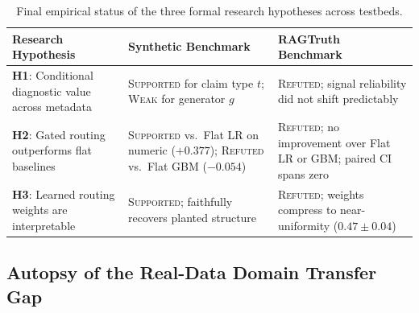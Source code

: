\documentclass[pdflatex,sn-mathphys,Numbered]{sn-jnl}
\begin{document}
\begin{table}[htbp]
\caption{Final empirical status of the three formal research hypotheses across testbeds.}\label{tab:hyp_status}
\footnotesize
\setlength{\tabcolsep}{4pt}
\begin{tabular}{@{}p{3.2cm}p{4.2cm}p{4.2cm}@{}}
\toprule
\textbf{Research Hypothesis} & \textbf{Synthetic Benchmark} & \textbf{RAGTruth Benchmark} \\
\midrule
\textbf{H1}: Conditional diagnostic value across metadata & \textsc{Supported} for claim type $t$; \textsc{Weak} for generator $g$ & \textsc{Refuted}; signal reliability did not shift predictably \\
\textbf{H2}: Gated routing outperforms flat baselines & \textsc{Supported} vs.\ Flat LR on numeric ($+0.377$); \textsc{Refuted} vs.\ Flat GBM ($-0.054$) & \textsc{Refuted}; no improvement over Flat LR or GBM; paired CI spans zero \\
\textbf{H3}: Learned routing weights are interpretable & \textsc{Supported}; faithfully recovers planted structure & \textsc{Refuted}; weights compress to near-uniformity ($0.47 \pm 0.04$) \\
\bottomrule
\end{tabular}
\end{table}

\subsection{Autopsy of the Real-Data Domain Transfer Gap}\label{subsec:autopsy}
\end{document}

